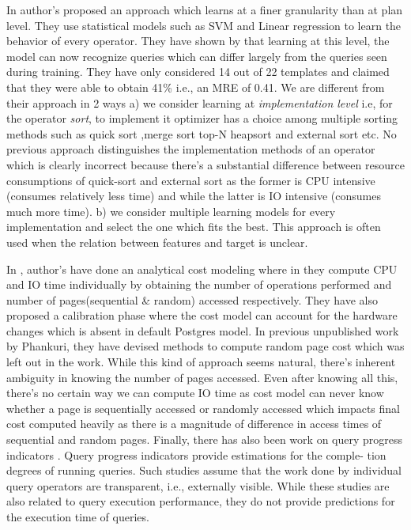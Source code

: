 \documentclass{article}
\begin{document}
\begin{multicols}{2}
	In \cite{ICDE2012, MSR} author's proposed an approach which learns at a finer granularity than 
	at plan level. They use statistical models such as SVM and Linear regression to learn the behavior of 
	every operator. They have shown by that learning at this level, the model can now recognize queries 		which can differ largely from the queries seen during training. They have only considered 14 out of 		22 templates and claimed that they were able to obtain 41\% i.e., an MRE of 0.41. We are different 			from their approach in 2 ways a) we consider learning at \textit{implementation level} i.e, for the operator \textit{sort}, to implement it optimizer has a choice among multiple sorting methods such as quick sort ,merge sort top-N heapsort and external sort etc. No previous approach distinguishes the implementation methods of an operator which is clearly incorrect because there's a substantial difference between resource consumptions of quick-sort and external sort as the former is CPU intensive (consumes relatively less time) and while the latter is IO intensive (consumes much more time). b) we consider multiple learning models for every implementation and select the one which fits the best. This approach is often used when the relation between features and target is unclear. 
	
	In \cite{analytical}, author's have done an analytical cost modeling where in they compute CPU and IO time individually by obtaining the number of operations performed and number of pages(sequential \& random) accessed respectively. They have also proposed a calibration phase where the cost model can account for the hardware changes which is absent in default Postgres model.  In previous unpublished work by Phankuri, they have devised methods to compute random page cost which was left out in the work\cite{analytical}. While this kind of approach seems natural, there's inherent ambiguity in knowing the number of pages accessed.  Even after knowing all this, there's no certain way we can compute IO time as cost model can never know whether a page is sequentially accessed or randomly accessed which impacts final cost computed heavily as there is a magnitude of difference in access times of sequential and random pages.
	Finally, there has also been work on query progress indicators \cite{progress}. Query progress indicators provide estimations for the comple-
	tion degrees of running queries. Such studies assume that the work
	done by individual query operators are transparent, i.e., externally
	visible. While these studies are also related to query execution performance,
	they do not provide predictions for the execution time of
	queries.
	

\end{multicols}
\end{document}
